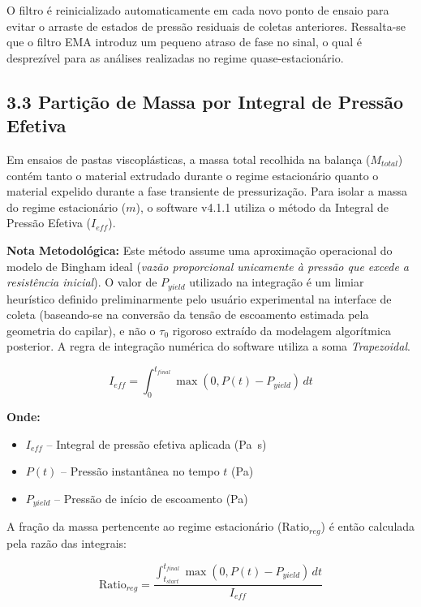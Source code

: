 \documentclass[a4paper,12pt]{article}
\begin{document}
O filtro é reinicializado automaticamente em cada novo ponto de ensaio para evitar o arraste de estados de pressão residuais de coletas anteriores. Ressalta-se que o filtro EMA introduz um pequeno atraso de fase no sinal, o qual é desprezível para as análises realizadas no regime quase-estacionário.

\subsection*{3.3 Partição de Massa por Integral de Pressão Efetiva}
Em ensaios de pastas viscoplásticas, a massa total recolhida na balança ($M_{total}$) contém tanto o material extrudado durante o regime estacionário quanto o material expelido durante a fase transiente de pressurização. Para isolar a massa do regime estacionário ($m$), o software v4.1.1 utiliza o método da Integral de Pressão Efetiva ($I_{eff}$).

\textbf{Nota Metodológica:} Este método assume uma aproximação operacional do modelo de Bingham ideal (\textit{vazão proporcional unicamente à pressão que excede a resistência inicial}). O valor de $P_{yield}$ utilizado na integração é um limiar heurístico definido preliminarmente pelo usuário experimental na interface de coleta (baseando-se na conversão da tensão de escoamento estimada pela geometria do capilar), e não o $\tau_0$ rigoroso extraído da modelagem algorítmica posterior. A regra de integração numérica do software utiliza a soma \textit{Trapezoidal}.

\begin{equation}
    I_{eff} = \int_{0}^{t_{final}} \max(0, P(t) - P_{yield}) \, dt
\end{equation}

\textbf{Onde:}
\begin{itemize}[leftmargin=1.5em]
  \item $I_{eff}$ -- Integral de pressão efetiva aplicada (\si{Pa.s})
  \item $P(t)$ -- Pressão instantânea no tempo $t$ (\si{Pa})
  \item $P_{yield}$ -- Pressão de início de escoamento (\si{Pa})
\end{itemize}

A fração da massa pertencente ao regime estacionário ($\text{Ratio}_{reg}$) é então calculada pela razão das integrais:

\begin{equation}
    \text{Ratio}_{reg} = \frac{\int_{t_{start}}^{t_{final}} \max(0, P(t) - P_{yield}) \, dt}{I_{eff}}
\end{equation}
\end{document}
